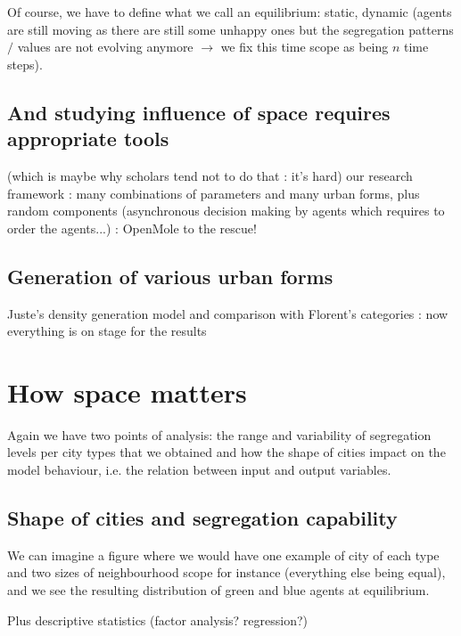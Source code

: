 \documentclass[a4paper,12pt]{article}
\begin{document}
Of course, we have to define what we call an equilibrium: static, dynamic (agents are still moving as there are still some unhappy ones but the segregation patterns$/$ values are not evolving anymore $\rightarrow$ we fix this time scope as being $n$ time steps). 



\subsection{And studying influence of space requires appropriate tools}

(which is maybe why scholars tend not to do that : it's hard)
our research framework : many combinations of parameters and many urban forms, plus random components (asynchronous decision making by agents which requires to order the agents...) : OpenMole to the rescue! 


\subsection{Generation of various urban forms}

Juste's density generation model and comparison with Florent's categories : 
now everything is on stage for the results




\section{How space matters}

Again we have two points of analysis: the range and variability of segregation levels per city types that we obtained and how the shape of cities impact on the model behaviour, i.e. the relation between input and output variables.


\subsection{Shape of cities and segregation capability}

We can imagine a figure where we would have one example of city of each type and two sizes of neighbourhood scope for instance (everything else being equal), and we see the resulting distribution of green and blue agents at equilibrium.

Plus descriptive statistics (factor analysis? regression?)
\end{document}

